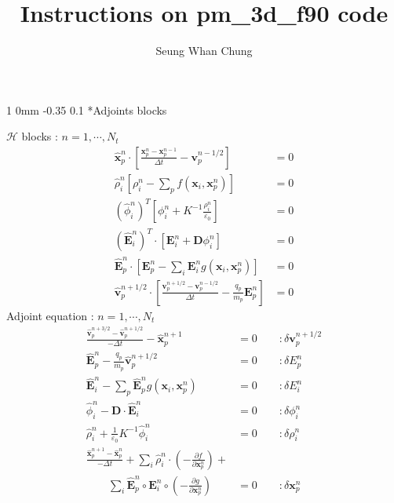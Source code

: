 \documentclass[11pt]{article}
\title{Instructions on pm\_3d\_f90 code}
\author{Seung Whan Chung}
\makeatletter
\renewcommand{\subsection}{\@startsection
{subsection}%
{1}%
{0mm}%
{-0.35\baselineskip}%
{0.1\baselineskip}%
{\normalfont\large\bfseries\color{brown}}}%
\def\Dpartial#1#2{ \frac{\partial #1}{\partial #2} }
\newcommand{\vp}{\mathbf{v}_p}
\newcommand{\xp}{\mathbf{x}_p}
\newcommand{\Dt}{\Delta t}
\newcommand{\vph}{\hat{\mathbf{v}}_p}
\newcommand{\xph}{\hat{\mathbf{x}}_p}
\newcommand{\Eh}{\hat{\mathbf{E}}}
\newcommand{\phih}{\hat{\phi}}
\newcommand{\rhoh}{\hat{\rho}}
\newcommand{\cH}{\mathcal{H}}
\makeatother
\begin{document}
\maketitle
\tableofcontents
\clearpage

\subsection*{Adjoints blocks}

\begin{multicols}{2}
$\cH$ blocks : $n=1,\cdots,N_t$
\begin{equation*}
\begin{split}
\xph^{n}\cdot\left[ \frac{\xp^{n} - \xp^{n-1}}{\Dt} - \vp^{n-1/2} \right] &= 0\\
\rhoh_{i}^n\left[ \rho_{i}^n - \sum\limits_p f\left( \mathbf{x}_{i}, \xp^n \right) \right] &= 0\\
\left( \phih_i^{n} \right)^T\left[ \phi_i^n + K^{-1}\frac{\rho_i^n}{\varepsilon_0} \right] &= 0\\
\left( \Eh_i^n \right)^T\cdot\left[ \mathbf{E}_i^n + \mathbf{D}\phi_i^n \right] &= 0\\
\Eh_{p}^{n}\cdot\left[ \mathbf{E}_{p}^{n} - \sum\limits_{i}\mathbf{E}_{i}^{n} g\left( \mathbf{x}_{i}, \xp^{n} \right) \right] &= 0\\
\vph^{n+1/2}\cdot\left[ \frac{\vp^{n+1/2} - \vp^{n-1/2}}{\Dt} - \frac{q_p}{m_p}\mathbf{E}_p^{n} \right] &= 0
\end{split}
\end{equation*}
Adjoint equation : $n=1,\cdots,N_t$
\begin{equation*}
\begin{split}
\frac{\vph^{n+3/2} - \vph^{n+1/2}}{-\Dt} - \xph^{n+1} &= 0\qquad:\delta \vp^{n+1/2}\\
\Eh_{p}^{n} - \frac{q_p}{m_p}\vph^{n+1/2} &= 0\qquad:\delta E_p^{n}\\
\Eh_{i}^{n} - \sum\limits_p \Eh_{p}^{n}g\left( \mathbf{x}_{i}, \xp^{n} \right) &= 0\qquad:\delta E_i^{n}\\
\phih_i^{n} - \mathbf{D}\cdot\Eh_i^{n} &= 0\qquad:\delta \phi_i^{n}\\
\rhoh_i^{n} + \frac{1}{\varepsilon_0}K^{-1}\phih_i^{n} &= 0\qquad:\delta \rho_i^{n}\\
\frac{\xph^{n+1} - \xph^{n}}{-\Dt} + \sum\limits_{i}\rhoh_{i}^{n}\cdot\left( -\Dpartial{f}{\xp^{n}} \right) + &\\
\qquad\sum\limits_{i} \Eh_{p}^{n}\circ\mathbf{E}_{i}^{n}\circ\left( -\Dpartial{g}{\xp^{n}} \right) &= 0\qquad:\delta \xp^{n}
\end{split}
\end{equation*}
\end{multicols}
\end{document}
